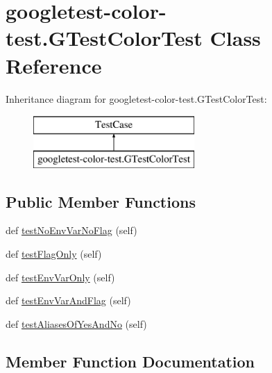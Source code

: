 \hypertarget{classgoogletest-color-test_1_1_g_test_color_test}{}\section{googletest-\/color-\/test.G\+Test\+Color\+Test Class Reference}
\label{classgoogletest-color-test_1_1_g_test_color_test}
Inheritance diagram for googletest-\/color-\/test.G\+Test\+Color\+Test\+:\begin{figure}[H]
\begin{center}
\leavevmode
\includegraphics[height=2.000000cm]{classgoogletest-color-test_1_1_g_test_color_test}
\end{center}
\end{figure}
\subsection*{Public Member Functions}
\begin{DoxyCompactItemize}
\item 
def \mbox{\hyperlink{classgoogletest-color-test_1_1_g_test_color_test_ae36014618c6afc19fa6d77babf8faa88}{test\+No\+Env\+Var\+No\+Flag}} (self)
\item 
def \mbox{\hyperlink{classgoogletest-color-test_1_1_g_test_color_test_ade41e99b5486c9d947d9b817210174f6}{test\+Flag\+Only}} (self)
\item 
def \mbox{\hyperlink{classgoogletest-color-test_1_1_g_test_color_test_a1f0a2bab46c123e865a821307bd689de}{test\+Env\+Var\+Only}} (self)
\item 
def \mbox{\hyperlink{classgoogletest-color-test_1_1_g_test_color_test_a8f6cbbaa18feb66b8b03e6cc1f493f49}{test\+Env\+Var\+And\+Flag}} (self)
\item 
def \mbox{\hyperlink{classgoogletest-color-test_1_1_g_test_color_test_a82dd36b6a0fa82d417b7ec5e660c6e41}{test\+Aliases\+Of\+Yes\+And\+No}} (self)
\end{DoxyCompactItemize}


\subsection{Member Function Documentation}
\mbox{\label{classgoogletest-color-test_1_1_g_test_color_test_ae36014618c6afc19fa6d77babf8faa88}} 
